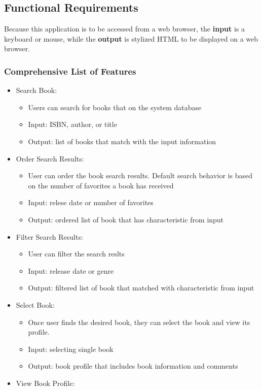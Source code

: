\documentclass[letter, 12pt, titlepage]{article}
\begin{document}
\subsection{Functional Requirements}
		Because this application is to be accessed from a web browser, the \textbf{input} is a keyboard or mouse, while the \textbf{output} is stylized HTML to be displayed on a web browser. 

	\subsubsection{Comprehensive List of Features}
	\begin{itemize}

	\item	Search Book:
		\begin{itemize}
			\item  Users can search for books that on the system database
			\item  Input: ISBN, author, or title
			\item  Output: list of books that match with the input information
		\end{itemize}
	\item	Order Search Results:
		\begin{itemize}
			\item  User can order the book search results. Default search behavior is based on the number of favorites a book has received
			\item  Input: relese date or number of favorites
			\item  Output: ordered list of book that has characteristic from input
		\end{itemize}
	\item	Filter Search Results:
		\begin{itemize}
			\item  User can filter the search reslts 
			\item  Input: release date or genre
			\item  Output: filtered list of book that matched with characteristic from input
		\end{itemize}
	\item	Select Book:
		\begin{itemize}
			\item  Once user finds the desired book, they can select the book and view its profile.
			\item  Input: selecting single book
			\item  Output: book profile that includes book information and comments
		\end{itemize}
	\item	View Book Profile:


\end{itemize}
\end{document}
